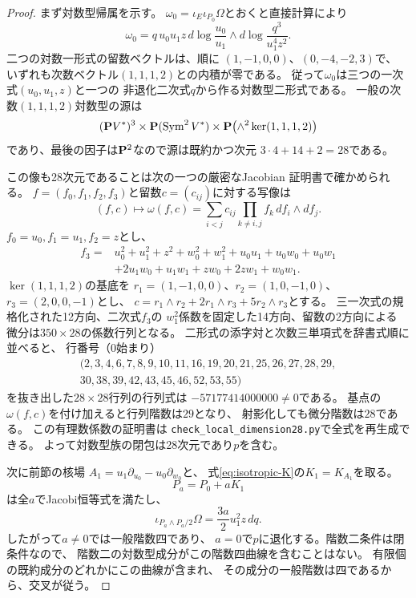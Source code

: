 \begin{proof}
まず対数型帰属を示す。
$\omega_0=\iota_E\iota_{P_0}\Omega$とおくと直接計算により
\begin{equation}\label{eq:isotropic-log-form}
 \boxed{\quad
 \omega_0=q\,u_0u_1z\,
 d\log\frac{u_0}{u_1}\wedge
 d\log\frac{q^3}{u_1^4z^2}.\quad}
\end{equation}
二つの対数一形式の留数ベクトルは、順に
$(1,-1,0,0)$、$(0,-4,-2,3)$で、
いずれも次数ベクトル$(1,1,1,2)$との内積が零である。
従って$\omega_0$は三つの一次式$(u_0,u_1,z)$と一つの
非退化二次式$q$から作る対数型二形式である。
一般の次数$(1,1,1,2)$対数型の源は
\[
 (\mathbf P V^*)^3\times\mathbf P(\operatorname{Sym}^2V^*)
 \times\mathbf P\bigl(\wedge^2\ker(1,1,1,2)\bigr)
\]
であり、最後の因子は$\mathbf P^2$なので源は既約かつ次元
$3\cdot4+14+2=28$である。

この像も28次元であることは次の一つの厳密なJacobian
証明書で確かめられる。
$f=(f_0,f_1,f_2,f_3)$と留数$c=(c_{ij})$に対する写像は
\begin{equation}\label{eq:logarithmic-source-map}
 (f,c)\longmapsto
 \omega(f,c)=\sum_{i<j}c_{ij}
 \prod_{k\ne i,j}f_k\,df_i\wedge df_j.
\end{equation}
$f_0=u_0,f_1=u_1,f_2=z$とし、
\[
 \begin{split}
 f_3={}&u_0^2+u_1^2+z^2+w_0^2+w_1^2
 +u_0u_1+u_0w_0+u_0w_1\\
 &+2u_1w_0+u_1w_1+zw_0+2zw_1+w_0w_1.
 \end{split}
\]
$\ker(1,1,1,2)$の基底を
$r_1=(1,-1,0,0)$、$r_2=(1,0,-1,0)$、
$r_3=(2,0,0,-1)$とし、
$c=r_1\wedge r_2+2r_1\wedge r_3+5r_2\wedge r_3$とする。
三一次式の規格化された12方向、二次式$f_3$の
$w_1^2$係数を固定した14方向、留数の2方向による
微分は$350\times28$の係数行列となる。
二形式の添字対と次数三単項式を辞書式順に並べると、
行番号（$0$始まり）
\[
\begin{split}
(2,3,4,6,7,8,9,10,11,16,19,20,21,25,26,27,28,29,\\
30,38,39,42,43,45,46,52,53,55)
\end{split}
\]
を抜き出した$28\times28$行列の行列式は
$-57177414000000\ne0$である。
基点の$\omega(f,c)$を付け加えると行列階数は$29$となり、
射影化しても微分階数は$28$である。
この有理数係数の証明書は
\texttt{check\_local\_dimension28.py}で全式を再生成できる。
よって対数型族の閉包は28次元であり$p$を含む。

次に前節の核場
$A_1=u_1\partial_{u_0}-u_0\partial_{w_0}$と、
式\eqref{eq:isotropic-K}の$K_1=K_{A_1}$を取る。
\[
 P_a=P_0+aK_1
\]
は全$a$でJacobi恒等式を満たし、
\begin{equation}\label{eq:isotropic-rankfour-curve}
 \iota_{P_a\wedge P_a/2}\Omega
   =\frac{3a}{2}u_1^2z\,dq .
\end{equation}
したがって$a\ne0$では一般階数四であり、
$a=0$で$p$に退化する。階数二条件は閉条件なので、
階数二の対数型成分がこの階数四曲線を含むことはない。
有限個の既約成分のどれかにこの曲線が含まれ、
その成分の一般階数は四であるから、交叉が従う。


\end{proof}
